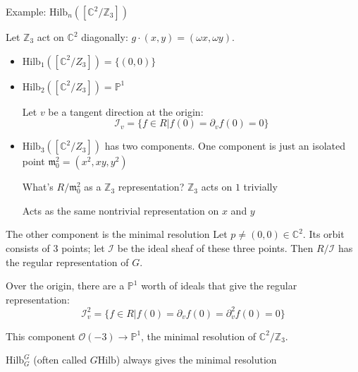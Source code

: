 \documentclass{beamer}
\newcommand{\Hilb}{\textrm{Hilb}}
\newcommand{\C}{\mathbb{C}}
\newcommand{\Z}{\mathbb{Z}}
\newcommand{\proj}{\mathbb{P}}
\begin{document}
\begin{frame}{Example: $\Hilb_n([\C^2/\Z_3])$}

Let $\Z_3$ act on $\C^2$ diagonally: $g\cdot(x,y)=(\omega x, \omega y)$.
\begin{itemize}
\item $\Hilb_1([\C^2/Z_3])=\{(0,0)\}$ 
\item $\Hilb_2([\C^2/Z_3])=\proj^1$ 

Let $v$ be a tangent direction at the origin: 
$$\mathcal{I}_v=\{f\in R | f(0)=\partial_vf(0)=0\}$$
\item
$\Hilb_3([\C^2/Z_3])$ has two components.  One component is just an isolated point $\mathfrak{m}_0^2=(x^2, xy, y^2)$

\begin{block}{What's $R/\mathfrak{m}_0^2$ as a $\Z_3$ representation?} 
$\Z_3$ acts on $1$ trivially

Acts as the same nontrivial representation on $x$ and $y$
\end{block}


\end{itemize}



\end{frame}

\begin{frame}{The other  component is the minimal resolution}
Let $p\neq(0,0)\in\C^2$.  Its orbit consists of $3$ points; let $\mathcal{I}$ be the ideal sheaf of these three points.  Then $R/\mathcal{I}$ has the regular representation of $G$.  

Over the origin, there are a $\proj^1$ worth of ideals that give the regular representation: 
$$\mathcal{I}_v^2=\{f\in R| f(0)=\partial_vf(0)=\partial_v^2 f(0)=0\}$$

This component $\mathcal{O}(-3)\to\proj^1$, the minimal resolution of $\C^2/\Z_3$.

\begin{block}{$\Hilb^G_G$ (often called $G\Hilb$) always gives the minimal resolution}
\end{block}

\end{frame}
\end{document}
